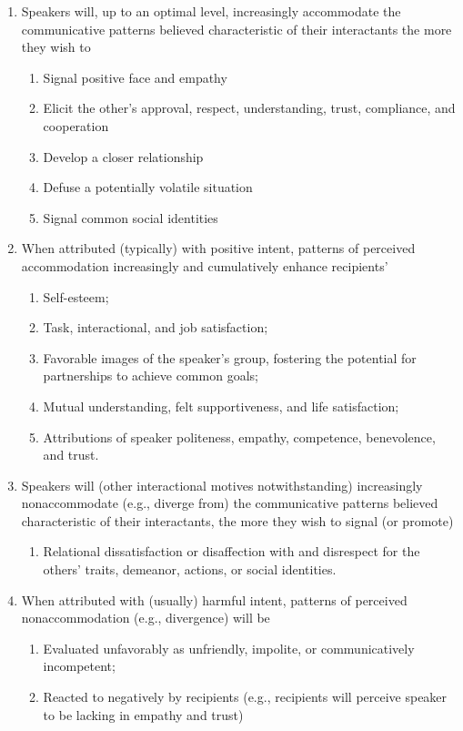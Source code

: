 \documentclass[
]{book}
\providecommand{\tightlist}{%
  \setlength{\itemsep}{0pt}\setlength{\parskip}{0pt}}
\begin{document}
\begin{enumerate}
\def\labelenumi{\arabic{enumi}.}
\item
  Speakers will, up to an optimal level, increasingly accommodate the communicative patterns believed characteristic
  of their interactants the more they wish to

  \begin{enumerate}
  \def\labelenumii{\arabic{enumii}.}
  \item
    Signal positive face and empathy
  \item
    Elicit the other's approval, respect, understanding, trust, compliance, and cooperation
  \item
    Develop a closer relationship
  \item
    Defuse a potentially volatile situation
  \item
    Signal common social identities
  \end{enumerate}
\item
  When attributed (typically) with positive intent, patterns of perceived accommodation increasingly and cumulatively
  enhance recipients'

  \begin{enumerate}
  \def\labelenumii{\arabic{enumii}.}
  \item
    Self-esteem;
  \item
    Task, interactional, and job satisfaction;
  \item
    Favorable images of the speaker's group, fostering the potential for partnerships to achieve common goals;
  \item
    Mutual understanding, felt supportiveness, and life satisfaction;
  \item
    Attributions of speaker politeness, empathy, competence, benevolence, and trust.
  \end{enumerate}
\item
  Speakers will (other interactional motives notwithstanding) increasingly nonaccommodate (e.g., diverge from) the
  communicative patterns believed characteristic of their interactants, the more they wish to signal (or promote)

  \begin{enumerate}
  \def\labelenumii{\arabic{enumii}.}
  \tightlist
  \item
    Relational dissatisfaction or disaffection with and disrespect for the others' traits, demeanor, actions, or
    social identities.
  \end{enumerate}
\item
  When attributed with (usually) harmful intent, patterns of perceived nonaccommodation (e.g., divergence) will be

  \begin{enumerate}
  \def\labelenumii{\arabic{enumii}.}
  \item
    Evaluated unfavorably as unfriendly, impolite, or communicatively incompetent;
  \item
    Reacted to negatively by recipients (e.g., recipients will perceive speaker to be lacking in empathy and trust)
  \end{enumerate}
\end{enumerate}
\end{document}

